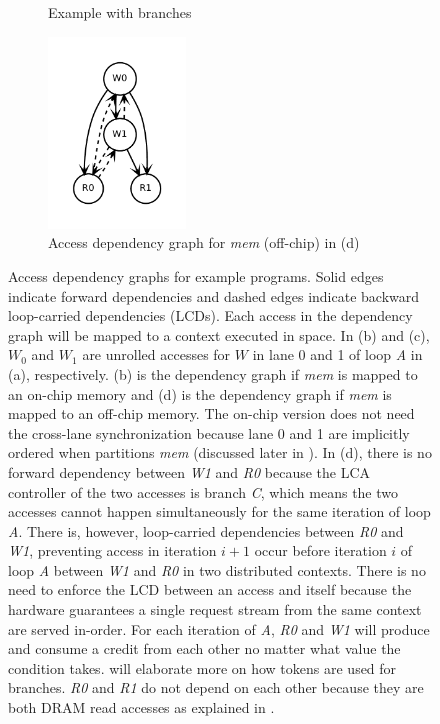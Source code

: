 \begin{figure}
\begin{subfigure}[b]{0.4\textwidth}
\inputminted{python}{code/dep3.py}
\caption{Example with branches}
\end{subfigure}
\begin{subfigure}[b]{0.5\textwidth}
  \centering
\includegraphics[width=0.4\textwidth]{figs/dep3.pdf}
  \caption{Access dependency graph for \emph{mem} (off-chip) in (d)}
\end{subfigure}

\caption[Examples for access dependency graph]{
  Access dependency graphs for example programs. 
  Solid edges indicate forward dependencies and
  dashed edges indicate backward loop-carried dependencies (LCDs).
  Each access in the dependency graph will be mapped to a context executed in space. 
  In (b) and (c),
  \emph{$W_0$} and \emph{$W_1$} are unrolled accesses for $W$ in lane 0 and 1 of loop \emph{A}
  in (a), respectively.
  (b) is the dependency graph if \emph{mem} is mapped to an on-chip memory and (d)
  is the dependency graph if \emph{mem} is mapped to an off-chip memory.
  The on-chip version does not need the cross-lane synchronization because 
  lane 0 and 1 are implicitly ordered when \name partitions \emph{mem} 
  (discussed later in ).
  In (d), there is no forward dependency between \emph{W1} and \emph{R0} because the LCA controller
  of the two accesses is branch \emph{C}, which means the two accesses cannot happen simultaneously 
  for the same iteration of loop \emph{A}.
  There is, however, loop-carried dependencies between \emph{R0} and \emph{W1}, preventing access
  in iteration $i+1$ occur before iteration $i$ of loop \emph{A} between \emph{W1} and \emph{R0} in
  two distributed contexts.
  There is no need to enforce the LCD between an access and itself because 
  the hardware guarantees a single request stream from the same context are served in-order.
  For each iteration of \emph{A}, \emph{R0} and \emph{W1} will produce and consume a credit from
  each other no matter what value the condition takes. 
   will elaborate more on how tokens are used for branches.
  \emph{R0} and \emph{R1} do not depend on each other because they are both DRAM read accesses as
  explained in .
}
\label{fig:depeg}
\end{figure}


